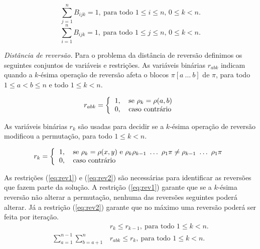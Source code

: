 \begin{equation}
\label{eq:posval}
  \sum_{j=1}^{n} B_{ijk} = 1,~\text{para todo $1 \le i \le n$, 
  $0 \le k < n$}.
\end{equation}
\begin{equation}
\label{eq:valpos}
  \sum_{i=1}^{n} B_{ijk} = 1,~\text{para todo $1 \le j \le n$, $0 \le
   k < n$}.
\end{equation}

\textit{Distância de reversão.}
Para o problema da distância de reversão definimos os seguintes
conjuntos de variáveis e restrições. As variáveis binárias $r_{abk}$
indicam quando a $k$-ésima operação de reversão afeta o blocos
$\pi[a~\ldots~b]$ de $\pi$, para todo $1 \le a < b \le n$ e todo
$1 \le k < n$.

\[
r_{abk} = \left \{ 
\begin{tabular}{ll} 
  1, & se $\rho_{k} = \rho(a,b)$ \\
  0, & caso contrário
\end{tabular} 
\right .
\]

As variáveis binárias $r_{k}$ são usadas para decidir se a $k$-ésima
operação de reversão modificou a permutação, para todo $ 1 \le k < n$.

\[
r_{k} = \left \{ 
\begin{tabular}{ll} 
 1, & se $\rho_{k} = \rho(x,y)$ e
 $\rho_{k} \rho_{k-1}~\ldots~\rho_{1} \pi \neq \rho_{k-1}~\ldots~\rho_{1} \pi$\\
 0, & caso contrário 
\end{tabular}
\right .
\]

As restrições (\ref{eq:rev1}) e (\ref{eq:rev2}) são necessárias para
identificar as reversões que fazem parte da solução. A restrição
(\ref{eq:rev1}) garante que se a $k$-ésima reversão não alterar a
permutação, nenhuma das reversões seguintes poderá alterar. Já a
restrição (\ref{eq:rev2}) garante que no máximo uma reversão poderá
ser feita por iteração.
\begin{align}
  &r_{k} \le r_{k-1},~\text{para todo $1 \le k <
  n$}. \label{eq:rev1} \\
  \sum_{a=1}^{n-1}\sum_{b=a+1}^{n}
  &r_{abk} \le r_{k},~\text{para todo $1 \le k < n$}. \label{eq:rev2}
\end{align}

